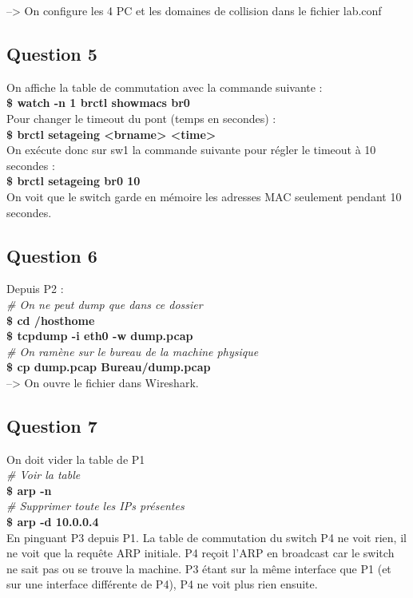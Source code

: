 \documentclass[a4paper]{article}
\begin{document}
--> On configure les 4 PC et les domaines de collision dans le fichier lab.conf

		\subsection{Question 5}
On affiche la table de commutation avec la commande suivante : \\
\textbf{\$ watch -n 1 brctl showmacs br0} \\

Pour changer le timeout du pont (temps en secondes) : \\
\textbf{\$ brctl setageing <brname> <time>} \\

On exécute donc sur sw1 la commande suivante pour régler le timeout à 10 secondes : \\
\textbf{\$ brctl setageing br0 10} \\

On voit que le switch garde en mémoire les adresses MAC seulement pendant 10 secondes. 

		\subsection{Question 6}
Depuis P2 : \\

\textit{\# On ne peut dump que dans ce dossier}\\
\textbf{\$ cd /hosthome} \\
\textbf{\$ tcpdump -i eth0 -w dump.pcap}\\
\textit{\# On ramène sur le bureau de la machine physique}\\
\textbf{\$ cp dump.pcap Bureau/dump.pcap}\\

--> On ouvre le fichier dans Wireshark.

		\subsection{Question 7}
On doit vider la table de P1 \\

\textit{\# Voir la table}\\
\textbf{\$ arp -n}\\
\textit{\# Supprimer toute les IPs présentes}\\
\textbf{\$ arp -d 10.0.0.4}\\

En pinguant P3 depuis P1. La table de commutation du switch P4 ne voit rien, il ne voit que la requête ARP initiale. P4 reçoit l'ARP en broadcast car le switch ne sait pas ou se trouve la machine. P3 étant sur la même interface que P1 (et sur une interface différente de P4), P4 ne voit plus rien ensuite.
 
\end{document}
